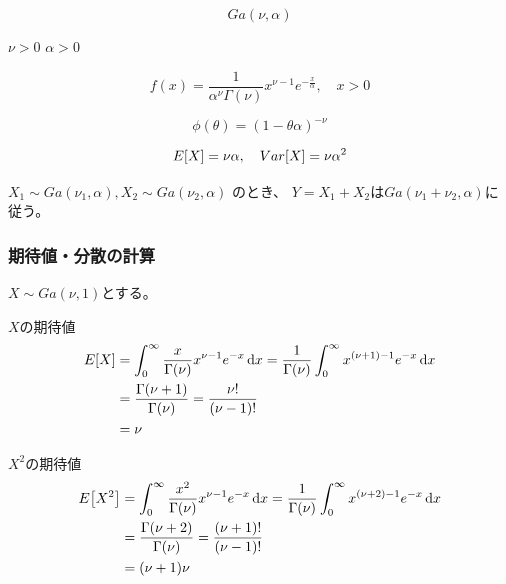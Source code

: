 \begin{outline}[description]
  \1 [表記]
  \begin{equation}
    Ga(\nu, \alpha)
  \end{equation}
  
  \1 [パラメータ]
  \2
   \(\nu > 0\)
   \(\alpha > 0\)
  
  \1 [密度関数]
  \begin{equation}
    f(x) = \frac{1}{\alpha^{\nu} \Gamma (\nu)} x ^ {\nu - 1} e ^ {- \frac{x}{\alpha}}, \quad x >0
  \end{equation}
  
  \1 [積率母関数]
  \begin{equation}
    \phi (\theta) = ( 1 - \theta \alpha) ^ {- \nu}
  \end{equation}
  
  \1 [期待値・分散]
  \begin{equation}
    E \qty [ X] = \nu \alpha, \quad Var \qty [ X ] = \nu \alpha ^2
  \end{equation}
  
  \1 [再生性]
  \(X_1 \sim Ga(\nu_1, \alpha), X_2 \sim Ga(\nu_2, \alpha)\) のとき、
  \(Y = X_1 + X_2\)は\(Ga(\nu_1 + \nu_2, \alpha)\)に従う。
\end{outline}

\subsubsection{期待値・分散の計算}

\(X \sim Ga(\nu, 1)\)とする。

\(X\)の期待値
\begin{equation}
  \begin{aligned}
    E \qty [X] & = \int_0^{\infty} \frac{x}{\Gamma(\nu)} x^{\nu - 1} e^{-x} \dd{x}
    = \frac{1}{\Gamma(\nu)} \int_0^{\infty}  x^{(\nu + 1) - 1} e^{-x} \dd{x}       \\
               & = \frac{\Gamma(\nu + 1)}{\Gamma(\nu)}
    = \frac{\nu !}{(\nu - 1)!}                                                     \\
               & = \nu
  \end{aligned}
\end{equation}

\(X^2\)の期待値
\begin{equation}
  \begin{aligned}
    E \qty [X^2] & = \int_0^{\infty} \frac{x^2}{\Gamma(\nu)} x^{\nu - 1} e^{-x} \dd{x}
    = \frac{1}{\Gamma(\nu)} \int_0^{\infty}  x^{(\nu + 2) - 1} e^{-x} \dd{x}           \\
                 & = \frac{\Gamma(\nu + 2)}{\Gamma(\nu)}
    = \frac{(\nu + 1)!}{(\nu - 1)!}                                                    \\
                 & = (\nu + 1)\nu
  \end{aligned}
\end{equation}

